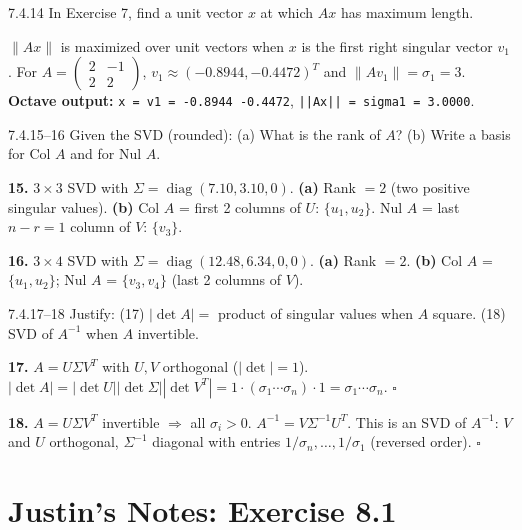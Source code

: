 \begin{exercise}{7.4.14}
In Exercise 7, find a unit vector $x$ at which $Ax$ has maximum length.
\end{exercise}
\begin{solution}
$\|Ax\|$ is maximized over unit vectors when $x$ is the first right singular vector $v_1$. For $A=\begin{pmatrix}2&-1\\2&2\end{pmatrix}$, $v_1\approx(-0.8944,-0.4472)^T$ and $\|Av_1\|=\sigma_1=3$. \textbf{Octave output:} \texttt{x = v1 = -0.8944 -0.4472}, \texttt{||Ax|| = sigma1 = 3.0000}.
\end{solution}

\begin{exercise}{7.4.15--16}
Given the SVD (rounded): (a) What is the rank of $A$? (b) Write a basis for Col $A$ and for Nul $A$.
\end{exercise}
\begin{solution}
\textbf{15.} $3\times3$ SVD with $\Sigma=\operatorname{diag}(7.10, 3.10, 0)$. \textbf{(a)} Rank $=2$ (two positive singular values). \textbf{(b)} Col $A$ = first 2 columns of $U$: $\{u_1, u_2\}$. Nul $A$ = last $n-r=1$ column of $V$: $\{v_3\}$.

\textbf{16.} $3\times4$ SVD with $\Sigma=\operatorname{diag}(12.48, 6.34, 0, 0)$. \textbf{(a)} Rank $=2$. \textbf{(b)} Col $A$ = $\{u_1, u_2\}$; Nul $A$ = $\{v_3, v_4\}$ (last 2 columns of $V$).
\end{solution}

\begin{exercise}{7.4.17--18}
Justify: (17) $|\det A|=$ product of singular values when $A$ square. (18) SVD of $A^{-1}$ when $A$ invertible.
\end{exercise}
\begin{solution}
\textbf{17.} $A=U\Sigma V^T$ with $U,V$ orthogonal ($|\det|=1$). $|\det A|=|\det U||\det\Sigma||\det V^T|=1\cdot(\sigma_1\cdots\sigma_n)\cdot1=\sigma_1\cdots\sigma_n$. $\square$

\textbf{18.} $A=U\Sigma V^T$ invertible $\Rightarrow$ all $\sigma_i>0$. $A^{-1}=V\Sigma^{-1}U^T$. This is an SVD of $A^{-1}$: $V$ and $U$ orthogonal, $\Sigma^{-1}$ diagonal with entries $1/\sigma_n,\ldots,1/\sigma_1$ (reversed order). $\square$
\end{solution}

\section*{Justin's Notes: Exercise 8.1}

